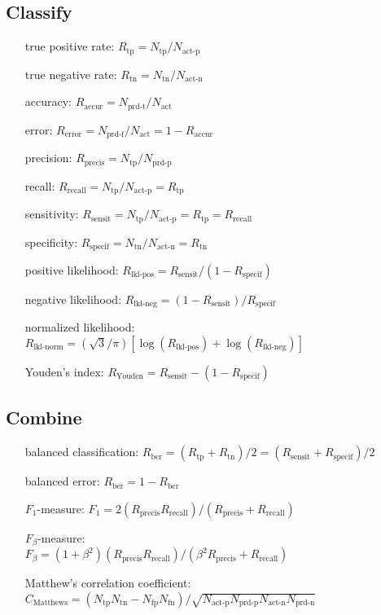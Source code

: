 \subsection*{Classify}
\begin{itemize}
\item [true positive rate:] $R_{\text{tp}} = N_{\text{tp}} / N_{\text{act-p}}$
\item [true negative rate:] $R_{\text{tn}} = N_{\text{tn}} /
  N_{\text{act-n}}$
\item [accuracy:] $R_{\text{accur}} = N_{\text{prd-t}} / N_{\text{act}}$
\item [error:] $R_{\text{error}} = N_{\text{prd-f}} / N_{\text{act}} = 1 - R_{\text{accur}}$
\item [precision:] $R_{\text{precis}} = N_{\text{tp}} / N_{\text{prd-p}}$
\item [recall:] $R_{\text{recall}} = N_{\text{tp}} / N_{\text{act-p}} = R_{\text{tp}}$
\item [sensitivity:] $R_{\text{sensit}} = N_{\text{tp}} / N_{\text{act-p}}
  = R_{\text{tp}} = R_{\text{recall}}$
\item [specificity:] $R_{\text{specif}} = N_{\text{tn}} / N_{\text{act-n}}
  = R_{\text{tn}}$
\item [positive likelihood:] $R_{\text{lkl-pos}} = R_{\text{sensit}} / (1 - R_{\text{specif}})$
\item [negative likelihood:] $R_{\text{lkl-neg}} = (1 -
  R_{\text{sensit}}) / R_{\text{specif}}$
\item [normalized likelihood:] \mbox{}\\%
  $R_{\text{lkl-norm}} = (\sqrt{3}/\pi)
  [\log(R_{\text{lkl-pos}}) + \log(R_{\text{lkl-neg}})]$
\item [Youden's index:] $R_{\text{Youden}} = R_{\text{sensit}} - (1 -
  R_{\text{specif}})$
\end{itemize}

\subsection*{Combine}
\begin{itemize}
\item [balanced classification:] $R_{\text{bcr}} = (R_{\text{tp}} +
  R_{\text{tn}})/2 = (R_{\text{sensit}} + R_{\text{specif}}) / 2$
\item [balanced error:] $R_{\text{ber}} = 1 - R_{\text{bcr}}$
\item [$F_1$-measure:] $F_1 = 2(R_{\text{precis}} R_{\text{recall}}) / (R_{\text{precis}} + R_{\text{recall}})$
\item [$F_{\beta}$-measure:] \mbox{}\\ $F_{\beta} = (1+\beta^2) (R_{\text{precis}}
  R_{\text{recall}}) / (\beta^2R_{\text{precis}} + R_{\text{recall}})$
\item [Matthew's correlation coefficient:] \mbox{}\\ $C_{\text{Matthews}} =
  (N_{\text{tp}}N_{\text{tn}} - N_{\text{fp}}N_{\text{fn}}) / %
  \sqrt{N_{\text{act-p}} N_{\text{prd-p}} N_{\text{act-n}} N_{\text{prd-n}}}$
\end{itemize}
